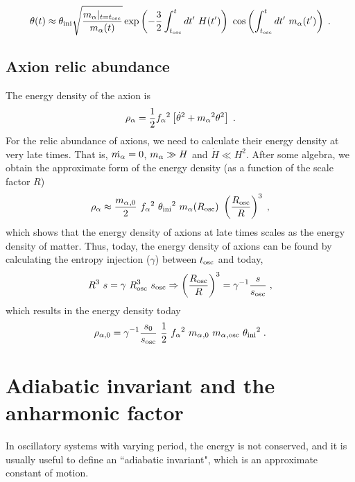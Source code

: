 \documentclass[11pt,a4paper]{article}
\begin{document}
\begin{equation}
	\theta(t) \approx \thetai \sqrt{ \dfrac{ \ma|_{t=\tosc} }{\ma  (t)} } \exp\lrb{-\dfrac{3}{2} \int_{\tosc}^t d t^\prime  \ H(t^\prime)} \  \cos\lrb{ \int_{\tosc}^t d t^\prime  \ \ma(t^\prime)}   \;.
	\label{eq:solution_eom_approx_final} 
\end{equation}

\subsection*{Axion relic abundance}
%
The energy density of the axion is 
%
\begin{eqnarray}
	\rho _\alpha = \dfrac{1}{2} f_{\alpha}{}^2 \left[  \dot{\theta}^2 + m_\alpha{}^2 \theta^2  \right] \;.
	\label{eq:rho_a_def} 
\end{eqnarray}
%
For the relic abundance of axions, we need to calculate their energy density at very late times. That is, $\dot {m_\alpha{}} = 0$, $m_\alpha{} \gg H$ and $\dot H \ll H^2$. After some algebra, we obtain the approximate form of the energy density (as a function of the scale factor $R$) 
%
\begin{eqnarray}
	\rho _\alpha \approx \dfrac{\ma_{,0} }{2}  \ \fa^2 \ \thetai^2  \ \ma(R_{\rm osc}) \ \lrb{\dfrac{R_{\rm osc}}{R}}^3 \;,
	\label{eq:rho_a0} 
\end{eqnarray}
%
which shows that the energy density of axions at late times scales as the energy density of matter. Thus, today, the energy density of axions can be found by calculating the entropy injection ($\gamma$) between $t_{\rm osc}{}$ and today, \ie
%
\begin{equation}
	R^3 \ s = \gamma \ R_{\rm osc}^3 \ s_{\rm osc} \Rightarrow  \left( \dfrac{R_{\rm osc}}{R} \right)^3 = \gamma^{-1} \dfrac{s}{s_{\rm osc}} \;,
\end{equation}
%
which results in the energy density today
\begin{eqnarray}
	\rho _{\alpha,0} = \gamma^{-1}  \dfrac{s_0}{s_{\rm osc}} \  \dfrac{1 }{2}  \ f_{\alpha}{}^2 \ m_\alpha{}_{,0} \ m_\alpha{}_{,{\rm osc}} \ \theta_{\rm ini}{}^2    \;.
	\label{eq:rho_a_approx} 
\end{eqnarray}
%

\section{Adiabatic invariant and the anharmonic factor}\label{sec:an_fac}
\setcounter{equation}{0}
%
In oscillatory systems with varying period, the energy is not conserved, and it is usually useful to define an ``adiabatic invariant", which is an approximate constant of motion.
\end{document}
